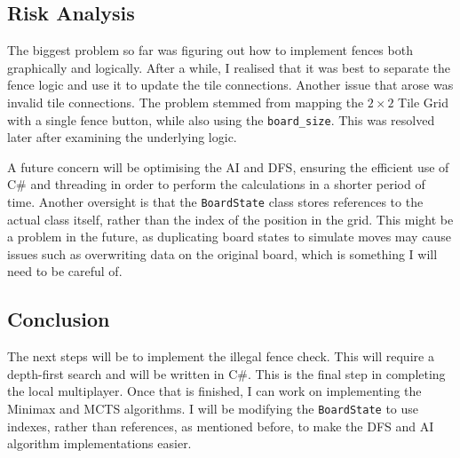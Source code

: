 \documentclass[progress]{cmpreport}
\begin{document}
\subsection{Risk Analysis}
The biggest problem so far was figuring out how to implement fences both graphically and logically. After a while, I realised that it was best to separate the fence logic and use it to update the tile connections. Another issue that arose was invalid tile connections. The problem stemmed from mapping the \(2 \times 2\) Tile Grid with a single fence button, while also using the \texttt{board\_size}. This was resolved later after examining the underlying logic.  

\noindent A future concern will be optimising the AI and DFS, ensuring the efficient use of C\# and threading in order to perform the calculations in a shorter period of time. Another oversight is that the \texttt{BoardState} class stores references to the actual class itself, rather than the index of the position in the grid. This might be a problem in the future, as duplicating board states to simulate moves may cause issues such as overwriting data on the original board, which is something I will need to be careful of.

\subsection{Conclusion}
The next steps will be to implement the illegal fence check. This will require a depth-first search and will be written in C\#. This is the final step in completing the local multiplayer. Once that is finished, I can work on implementing the Minimax and MCTS algorithms. I will be modifying the \texttt{BoardState} to use indexes, rather than references, as mentioned before, to make the DFS and AI algorithm implementations easier.

\newpage
\appendix
\end{document}
